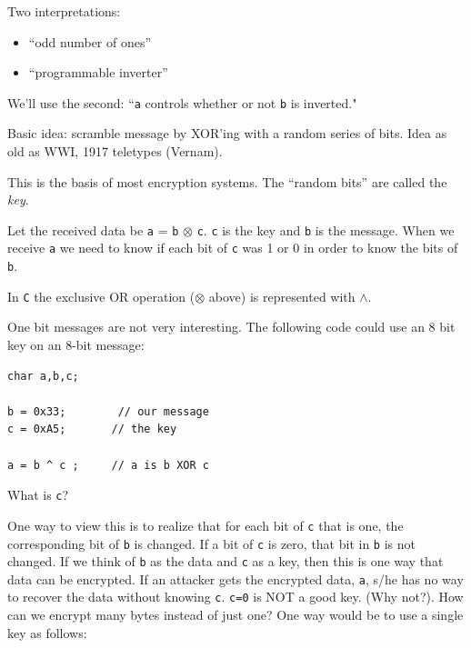   
Two interpretations:
\begin{itemize}
        \item ``odd number of ones''
        \item ``programmable inverter''
\end{itemize}
We'll use the second:   ``{\tt a} controls whether or not {\tt b} is inverted."

Basic idea:   scramble message by XOR'ing with a random series of
bits.  Idea as old as WWI, 1917 teletypes  (Vernam).

This is the basis of most encryption systems.  The ``random bits''
are called the {\it key}.

Let the received data be {\tt a} = {\tt b} $\otimes$ {\tt c}.
{\tt c} is the key and {\tt b} is the message.  When we receive {\tt a} we need to know if each bit of {\tt c} was
1 or 0 in order to know the bits of {\tt b}.

In {\tt C} the exclusive OR operation ($\otimes$ above) is represented with $\wedge$.

One bit messages are not very interesting.   The following code could use an 8 bit key on
an 8-bit message:
\begin{verbatim}
char a,b,c;

b = 0x33;        // our message
c = 0xA5;       // the key

a = b ^ c ;     // a is b XOR c
\end{verbatim}
What is {\tt c}?

One way to view this is to realize that for each bit of {\tt c} that is one, the
corresponding bit of {\tt b} is changed.  If a bit of {\tt c} is zero,  that bit
in {\tt b} is not changed.   If we think of {\tt b} as the data and {\tt c} as a
 key, then this is one way that data can be encrypted.  If an attacker gets the
encrypted data, {\tt a}, s/he has no way to recover the data without knowing
{\tt c}.   {\tt c=0} is NOT a good key. (Why not?). How can we encrypt many
bytes instead of just one? One way would be to use a single key as follows:


